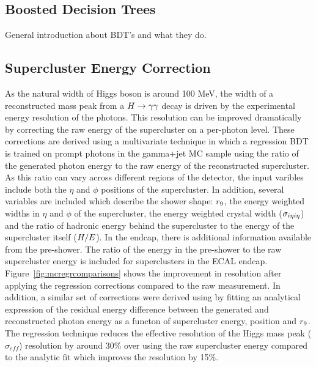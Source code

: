 \subsection{Boosted Decision Trees}
General introduction about BDT's and what they do.
\label{sec:boosteddecisiontrees}


\subsection{Supercluster Energy Correction}
\label{superclusterenergyreconstruction}

As the natural width of Higgs boson is around 100 MeV, the width of a reconstructed mass peak from 
a $H\rightarrow\gamma\gamma$ decay is driven by the experimental energy resolution of the photons.
This resolution can be improved dramatically by correcting the raw energy of the supercluster 
on a per-photon level. These corrections are derived using a multivariate technique 
in which a regression BDT is trained on prompt photons in the gamma+jet MC sample using the 
ratio of the generated photon energy to the raw energy of the reconstructed supercluster.
As this ratio can vary across different regions of the detector, the input varibles include both the 
$\eta$ and $\phi$ positions of the supercluster. In addition, several variables are included which 
describe the shower shape: $r_{9}$, the energy weighted widths in $\eta$ and $\phi$ of the supercluster,
the energy weighted crystal width ($\sigma_{i\eta i\eta}$) and the ratio of hadronic energy behind the supercluster
to the energy of the supercluster itself ($H/E$). In the endcap, there is additional information 
available from the pre-shower. The ratio of the energy in the pre-shower to the raw supercluster energy
is included for superclusters in the ECAL endcap. Figure~\ref{fig:mcregrcomparisons} shows the improvement
in resolution after applying the regression corrections compared to the raw measurement.
In addition, a similar set of corrections were derived using by fitting an analytical expression 
of the residual energy difference between the 
generated and reconstructed photon energy as a functon of supercluster energy, position and $r_{9}$. 
The regression technique reduces the effective resolution of the Higgs mass peak ($\sigma_{eff}$) 
resolution by around 30\% over using the raw supercluster energy compared to the analytic fit which
improves the resolution by 15\%. 

